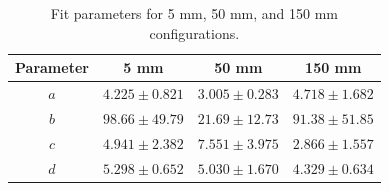 \documentclass[tightenlines,
twocolumn,prl,notitlepage,nofootinbib,preprintnumbers,longbibliography]{revtex4-1}
\begin{document}
\begin{table}[h]
\centering
\begin{tabular}{c c c c}
\hline
Parameter & 5 mm & 50 mm & 150 mm \\
\hline
$a$ & $4.225 \pm 0.821$ 
    & $3.005 \pm 0.283$ 
    & $4.718 \pm 1.682$ \\

$b$ & $98.66 \pm 49.79$ 
    & $21.69 \pm 12.73$ 
    & $91.38 \pm 51.85$ \\

$c$ & $4.941 \pm 2.382$ 
    & $7.551 \pm 3.975$ 
    & $2.866 \pm 1.557$ \\

$d$ & $5.298 \pm 0.652$ 
    & $5.030 \pm 1.670$ 
    & $4.329 \pm 0.634$ \\
\hline
\end{tabular}
\caption{Fit parameters for 5 mm, 50 mm, and 150 mm configurations.}
\label{tab:fit_parameters}
\end{table}

\end{document}
